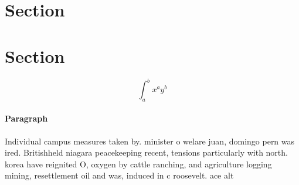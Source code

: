 \documentclass[a4paper]{article}
\begin{document}
\section{Section}

\section{Section}

\[ \int_{a}^{b}{x^{a}y^{b}} \]

\paragraph{Paragraph}
Individual campus measures taken by. minister o welare juan, domingo pern was ired. Britishheld niagara peacekeeping recent, tensions particularly with north. korea have reignited O, oxygen by cattle ranching, and agriculture logging mining, resettlement oil and was, induced in c roosevelt. ace alt
\end{document}
